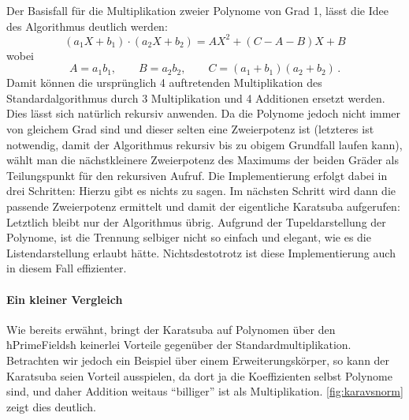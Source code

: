 Der Basisfall für die Multiplikation zweier Polynome von Grad 1, lässt die Idee
des Algorithmus deutlich werden:
\[ (a_1 X + b_1) \cdot (a_2 X + b_2) = 
  A X^2 + (C - A - B) X + B\]
wobei 
\[ A = a_1 b_1, \qquad B = a_2b_2, \qquad C = (a_1+b_1)(a_2+b_2) \,.\]
Damit können die ursprünglich 4 auftretenden Multiplikation des
Standardalgorithmus durch 3 Multiplikation und 4 Additionen ersetzt werden.
Dies lässt sich natürlich rekursiv anwenden. Da die Polynome jedoch nicht immer
von gleichem Grad sind und dieser selten eine Zweierpotenz ist (letzteres ist
notwendig, damit der Algorithmus rekursiv bis zu obigem Grundfall laufen kann),
wählt man die nächstkleinere Zweierpotenz des Maximums der beiden Gräder als
Teilungspunkt für den rekursiven Aufruf.
Die Implementierung erfolgt dabei in drei Schritten: 
Hierzu gibt es nichts zu sagen. Im nächsten Schritt wird dann die passende
Zweierpotenz ermittelt und damit der eigentliche Karatsuba aufgerufen:
Letztlich bleibt nur der Algorithmus übrig. Aufgrund der Tupeldarstellung der
Polynome, ist die Trennung selbiger nicht so einfach und elegant, wie es die
Listendarstellung erlaubt hätte. Nichtsdestotrotz ist diese Implementierung
auch in diesem Fall effizienter.

\paragraph{Ein kleiner Vergleich}
Wie bereits erwähnt, bringt der Karatsuba auf Polynomen über den ħPrimeFieldsħ
keinerlei Vorteile gegenüber der Standardmultiplikation. Betrachten wir jedoch
ein Beispiel über einem Erweiterungskörper, so kann der Karatsuba seien Vorteil
ausspielen, da dort ja die Koeffizienten selbst Polynome sind, und daher
Addition weitaus "`billiger"' ist als Multiplikation.
\autoref{fig:karavsnorm} zeigt dies deutlich.

